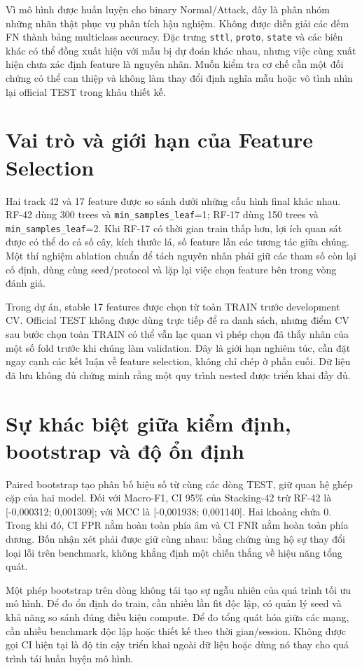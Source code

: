 Vì mô hình được huấn luyện cho binary Normal/Attack, đây là phân nhóm những nhãn thật phục vụ phân tích hậu nghiệm. Không được diễn giải các đếm FN thành bảng multiclass accuracy. Đặc trưng \texttt{sttl}, \texttt{proto}, \texttt{state} và các biến khác có thể đồng xuất hiện với mẫu bị dự đoán khác nhau, nhưng việc cùng xuất hiện chưa xác định feature là nguyên nhân. Muốn kiểm tra cơ chế cần một đối chứng có thể can thiệp và không làm thay đổi định nghĩa mẫu hoặc vô tình nhìn lại official TEST trong khâu thiết kế.

\section{Vai trò và giới hạn của Feature Selection}
Hai track 42 và 17 feature được so sánh dưới những cấu hình final khác nhau. RF-42 dùng 300 trees và \texttt{min\_samples\_leaf}=1; RF-17 dùng 150 trees và \texttt{min\_samples\_leaf}=2. Khi RF-17 có thời gian train thấp hơn, lợi ích quan sát được có thể do cả số cây, kích thước lá, số feature lẫn các tương tác giữa chúng. Một thí nghiệm ablation chuẩn để tách nguyên nhân phải giữ các tham số còn lại cố định, dùng cùng seed/protocol và lặp lại việc chọn feature bên trong vòng đánh giá.

Trong dự án, stable 17 features được chọn từ toàn TRAIN trước development CV. Official TEST không được dùng trực tiếp để ra danh sách, nhưng điểm CV sau bước chọn toàn TRAIN có thể vẫn lạc quan vì phép chọn đã thấy nhãn của một số fold trước khi chúng làm validation. Đây là giới hạn nghiêm túc, cần đặt ngay cạnh các kết luận về feature selection, không chỉ chép ở phần cuối. Dữ liệu đã lưu không đủ chứng minh rằng một quy trình nested được triển khai đầy đủ.

\section{Sự khác biệt giữa kiểm định, bootstrap và độ ổn định}
Paired bootstrap tạo phân bố hiệu số từ cùng các dòng TEST, giữ quan hệ ghép cặp của hai model. Đối với Macro-F1, CI 95\% của Stacking-42 trừ RF-42 là [-0,000312; 0,001309]; với MCC là [-0,001938; 0,001140]. Hai khoảng chứa 0. Trong khi đó, CI FPR nằm hoàn toàn phía âm và CI FNR nằm hoàn toàn phía dương. Bốn nhận xét phải được giữ cùng nhau: bằng chứng ủng hộ sự thay đổi loại lỗi trên benchmark, không khẳng định một chiến thắng về hiệu năng tổng quát.

Một phép bootstrap trên dòng không tái tạo sự ngẫu nhiên của quá trình tối ưu mô hình. Để đo ổn định do train, cần nhiều lần fit độc lập, có quản lý seed và khả năng so sánh đúng điều kiện compute. Để đo tổng quát hóa giữa các mạng, cần nhiều benchmark độc lập hoặc thiết kế theo thời gian/session. Không được gọi CI hiện tại là độ tin cậy triển khai ngoài dữ liệu hoặc dùng nó thay cho quá trình tái huấn luyện mô hình.

